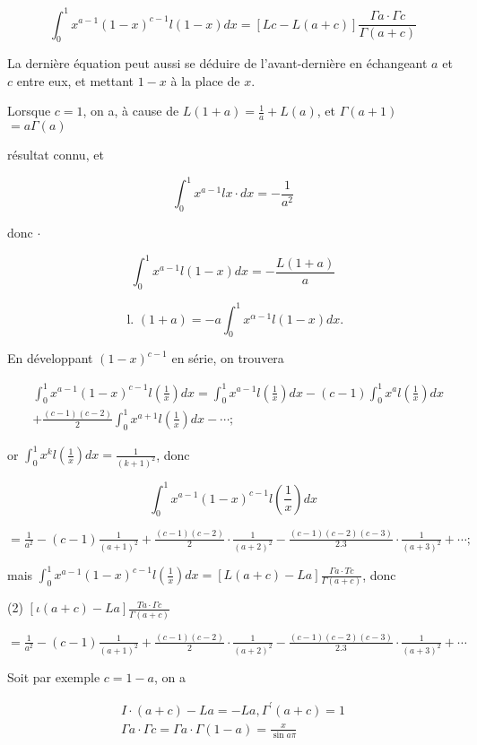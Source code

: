 \documentclass{article}
\begin{document}
\[
\int_{0}^{1} x^{a-1}(1-x)^{c-1} l(1-x) d x=[L c-L(a+c)] \frac{\Gamma a \cdot \Gamma c}{\Gamma(a+c)}
\]

La dernière équation peut aussi se déduire de l'avant-dernière en échangeant \(a\) et \(c\) entre eux, et mettant \(1-x\) à la place de \(x\).

Lorsque \(c=1\), on a, à cause de \(L(1+a)=\frac{1}{a}+L(a)\), et \(\Gamma(a+1)\) \(=a \Gamma(a)\)

résultat connu, et

\[
\int_{0}^{1} x^{a-1} l x \cdot d x=-\frac{1}{a^{2}}
\]

donc \(\cdot\)

\[
\int_{0}^{1} x^{a-1} l(1-x) d x=-\frac{L(1+a)}{a}
\]

\[
\text { l. }(1+a)=-a \int_{0}^{1} x^{\alpha-1} l(1-x) d x .
\]

En développant \((1-x)^{c-1}\) en série, on trouvera

\[
\begin{aligned}
& \int_{0}^{1} x^{a-1}(1-x)^{c-1} l\left(\frac{1}{x}\right) d x=\int_{0}^{1} x^{a-1} l\left(\frac{1}{x}\right) d x-(c-1) \int_{0}^{1} x^{a} l\left(\frac{1}{x}\right) d x \\
&+\frac{(c-1)(c-2)}{2} \int_{0}^{1} x^{a+1} l\left(\frac{1}{x}\right) d x-\cdots ;
\end{aligned}
\]

or \(\int_{0}^{1} x^{k} l\left(\frac{1}{x}\right) d x=\frac{1}{(k+1)^{2}}\), donc

\[
\int_{0}^{1} x^{a-1}(1-x)^{c-1} l\left(\frac{1}{x}\right) d x
\]

\(=\frac{1}{a^{2}}-(c-1) \frac{1}{(a+1)^{2}}+\frac{(c-1)(c-2)}{2} \cdot \frac{1}{(a+2)^{2}}-\frac{(c-1)(c-2)(c-3)}{2.3} \cdot \frac{1}{(a+3)^{2}}+\cdots ;\)

mais \(\int_{0}^{1} x^{a-1}(1-x)^{c-1} l\left(\frac{1}{x}\right) d x=[L(a+c)-L a] \frac{\Gamma a \cdot T c}{\Gamma(a+c)}\), donc

(2) \([\iota(a+c)-L a] \frac{T a \cdot \Gamma c}{\Gamma(a+c)}\)

\(=\frac{1}{a^{2}}-(c-1) \frac{1}{(a+1)^{2}}+\frac{(c-1)(c-2)}{2} \cdot \frac{1}{(a+2)^{2}}-\frac{(c-1)(c-2)(c-3)}{2.3} \cdot \frac{1}{(a+3)^{2}}+\cdots\)

Soit par exemple \(c=1-a\), on a

\[
\begin{gathered}
I \cdot(a+c)-L a=-L a, \Gamma^{\prime}(a+c)=1 \\
\Gamma a \cdot \Gamma c=\Gamma a \cdot \Gamma(1-a)=\frac{x}{\sin a \pi}
\end{gathered}
\]
\end{document}
